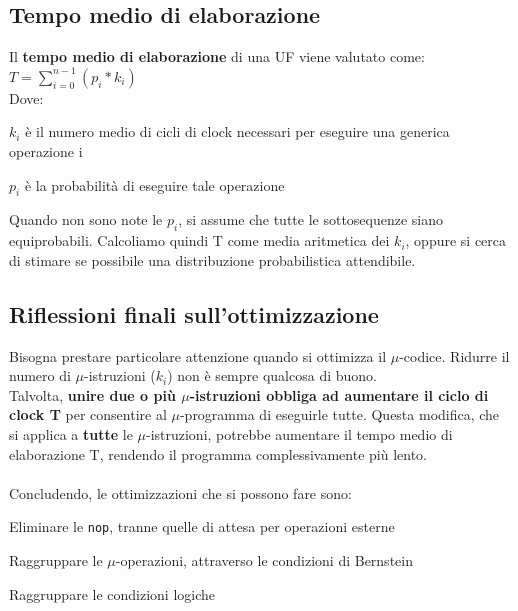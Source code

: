 \documentclass[10pt]{report}
\begin{document}
\subsection{Tempo medio di elaborazione}
Il \textbf{tempo medio di elaborazione} di una UF viene valutato come: \texttt{$T = \sum_{i = 0}^{n - 1}(p_i * k_i) $}\\
Dove:
\begin{list}{}{}
	\item $k_i$ è il numero medio di cicli di clock necessari per eseguire una generica operazione i
	\item $p_i$ è la probabilità di eseguire tale operazione
\end{list}
Quando non sono note le $p_i$, si assume che tutte le sottosequenze siano equiprobabili. Calcoliamo quindi T come media aritmetica dei $k_i$, oppure si cerca di stimare se possibile una distribuzione probabilistica attendibile.
\subsection{Riflessioni finali sull'ottimizzazione}
Bisogna prestare particolare attenzione quando si ottimizza il $\mu$-codice. Ridurre il numero di $\mu$-istruzioni ($k_i$) non è sempre qualcosa di buono.\\
Talvolta, \textbf{unire due o più $\mu$-istruzioni obbliga ad aumentare il ciclo di clock T} per consentire al $\mu$-programma di eseguirle tutte. Questa modifica, che si applica a \textbf{tutte} le $\mu$-istruzioni, potrebbe aumentare il tempo medio di elaborazione T, rendendo il programma complessivamente più lento.\\\\
Concludendo, le ottimizzazioni che si possono fare sono:
\begin{list}{}{}
	\item Eliminare le \texttt{nop}, tranne quelle di attesa per operazioni esterne
	\item Raggruppare le $\mu$-operazioni, attraverso le condizioni di Bernstein
	\item Raggruppare le condizioni logiche
\end{list}
\end{document}
